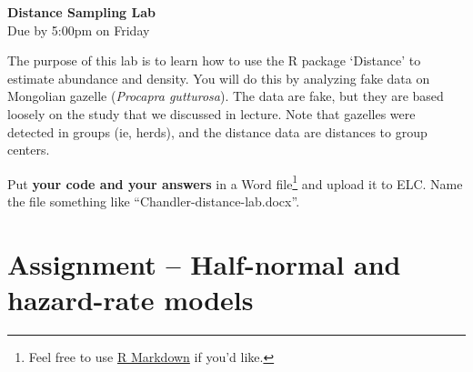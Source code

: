 \documentclass[12pt]{article}\usepackage[]{graphicx}\usepackage[]{xcolor}
\begin{document}
{
  \Large
  \centering
  {\bf Distance Sampling Lab \\ }
  Due by 5:00pm on Friday \\
}

\vspace{24pt}

The purpose of this lab is to learn how to use the
R package `Distance' to estimate abundance and density. You will
do this by analyzing fake data on Mongolian gazelle ({\it Procapra
  gutturosa}). The data are fake, but they are based loosely on the
study that we discussed in lecture. Note that gazelles were detected
in groups (ie, herds), and the distance data are distances to group
centers. 

Put {\bf your code and your answers} in a Word file\footnote{Feel free
  to use \href{https://rmarkdown.rstudio.com/}{R Markdown} if you'd
  like.} and upload it to ELC. Name the file something like
``Chandler-distance-lab.docx''.



\section*{Assignment -- Half-normal and hazard-rate models}
\end{document}
